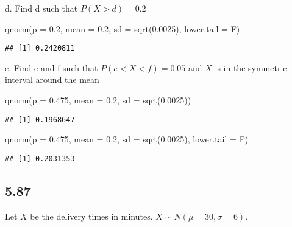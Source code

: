 \documentclass[
]{article}
\newenvironment{Shaded}{\begin{snugshade}}{\end{snugshade}}
\newcommand{\AttributeTok}[1]{\textcolor[rgb]{0.77,0.63,0.00}{#1}}
\newcommand{\FloatTok}[1]{\textcolor[rgb]{0.00,0.00,0.81}{#1}}
\newcommand{\FunctionTok}[1]{\textcolor[rgb]{0.00,0.00,0.00}{#1}}
\newcommand{\NormalTok}[1]{#1}
\begin{document}
d. Find d such that \(P(X > d) = 0.2\)~

\begin{Shaded}
\begin{Highlighting}[]
\FunctionTok{qnorm}\NormalTok{(}\AttributeTok{p =} \FloatTok{0.2}\NormalTok{, }\AttributeTok{mean =} \FloatTok{0.2}\NormalTok{, }\AttributeTok{sd =} \FunctionTok{sqrt}\NormalTok{(}\FloatTok{0.0025}\NormalTok{), }\AttributeTok{lower.tail =}\NormalTok{ F)}
\end{Highlighting}
\end{Shaded}

\begin{verbatim}
## [1] 0.2420811
\end{verbatim}

e. Find e and f such that \(P(e< X < f) = 0.05\) and \(X\) is in the
symmetric interval around the mean

\begin{Shaded}
\begin{Highlighting}[]
\FunctionTok{qnorm}\NormalTok{(}\AttributeTok{p =} \FloatTok{0.475}\NormalTok{, }\AttributeTok{mean =} \FloatTok{0.2}\NormalTok{, }\AttributeTok{sd =} \FunctionTok{sqrt}\NormalTok{(}\FloatTok{0.0025}\NormalTok{))}
\end{Highlighting}
\end{Shaded}

\begin{verbatim}
## [1] 0.1968647
\end{verbatim}

\begin{Shaded}
\begin{Highlighting}[]
\FunctionTok{qnorm}\NormalTok{(}\AttributeTok{p =} \FloatTok{0.475}\NormalTok{, }\AttributeTok{mean =} \FloatTok{0.2}\NormalTok{, }\AttributeTok{sd =} \FunctionTok{sqrt}\NormalTok{(}\FloatTok{0.0025}\NormalTok{), }\AttributeTok{lower.tail =}\NormalTok{ F)}
\end{Highlighting}
\end{Shaded}

\begin{verbatim}
## [1] 0.2031353
\end{verbatim}

\hypertarget{section-5}{%
\subsection{5.87}\label{section-5}}

Let \(X\) be the delivery times in minutes.
\(X \sim N(\mu = 30, \sigma = 6)\).
\end{document}
